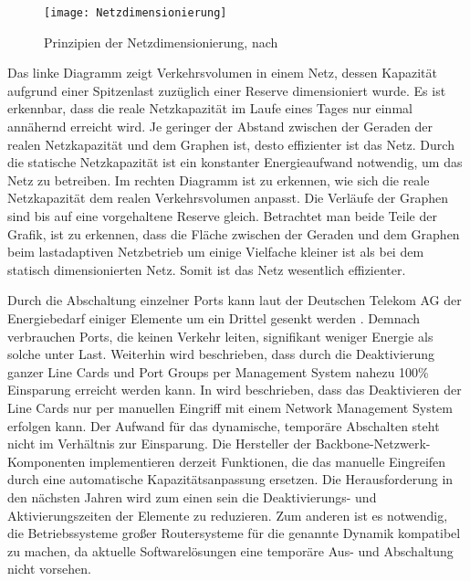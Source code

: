 \begin{figure}[htb]
	\centering
	\texttt{[image: Netzdimensionierung]}
	\caption{Prinzipien der Netzdimensionierung, nach \cite{fisher}}
	\label{fig:Netzdimensionierung}
\end{figure}

Das linke Diagramm  zeigt Verkehrsvolumen in einem Netz, dessen Kapazität aufgrund einer Spitzenlast zuzüglich einer Reserve dimensioniert wurde. Es ist erkennbar, dass die reale Netzkapazität im Laufe eines Tages nur einmal annähernd erreicht wird. Je geringer der Abstand zwischen der Geraden der realen Netzkapazität und dem Graphen ist, desto effizienter ist das Netz. Durch die statische Netzkapazität ist ein konstanter Energieaufwand notwendig, um das Netz zu betreiben. 
Im rechten Diagramm  ist zu erkennen, wie sich die reale Netzkapazität dem realen Verkehrsvolumen anpasst. Die Verläufe der Graphen sind bis auf eine vorgehaltene Reserve gleich. Betrachtet man beide Teile der Grafik, ist zu erkennen, dass die Fläche zwischen der Geraden und dem Graphen beim lastadaptiven Netzbetrieb um einige Vielfache kleiner ist als bei dem statisch dimensionierten Netz. Somit ist das Netz wesentlich effizienter.

Durch die Abschaltung einzelner Ports kann laut der Deutschen Telekom AG der Energiebedarf einiger Elemente um ein Drittel gesenkt werden \cite[4]{lange}. Demnach verbrauchen Ports, die keinen Verkehr leiten, signifikant weniger Energie als solche unter Last. Weiterhin wird beschrieben, dass durch die Deaktivierung ganzer Line Cards und Port Groups per Management System nahezu 100\% Einsparung erreicht werden kann. In  \cite{lange} wird beschrieben, dass das Deaktivieren der Line Cards nur per manuellen Eingriff mit einem Network Management System erfolgen kann. Der Aufwand für das dynamische, temporäre Abschalten steht nicht im Verhältnis zur Einsparung. Die Hersteller der Backbone-Netzwerk-Komponenten implementieren derzeit Funktionen, die das manuelle Eingreifen durch eine automatische Kapazitätsanpassung ersetzen. Die Herausforderung in den nächsten Jahren wird zum einen sein die Deaktivierungs- und Aktivierungszeiten der Elemente zu reduzieren. Zum anderen ist es notwendig, die Betriebssysteme großer Routersysteme für die genannte Dynamik kompatibel zu machen, da aktuelle Softwarelösungen eine temporäre Aus- und Abschaltung nicht vorsehen.

